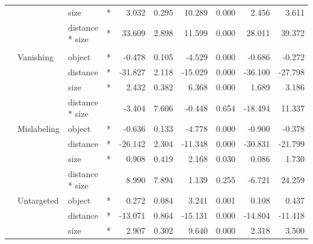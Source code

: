 \begin{longtable}[t]{llllrrrrrr}
\cmidrule{3-10}\nopagebreak
\hspace{1em} &  & size & * & 3.032 & 0.295 & 10.289 & 0.000 & 2.456 & 3.611\\
\cmidrule{3-10}\nopagebreak
\hspace{1em} &  & distance * size & * & 33.609 & 2.898 & 11.599 & 0.000 & 28.011 & 39.372\\
\cmidrule{1-10}\pagebreak[0]
\addlinespace[0.3em]
\multicolumn{10}{l}{\textbf{Faster R-CNN}}\\
\hspace{1em} & Vanishing & object & * & -0.478 & 0.105 & -4.529 & 0.000 & -0.686 & -0.272\\
\cmidrule{3-10}\nopagebreak
\hspace{1em} &  & distance & * & -31.827 & 2.118 & -15.029 & 0.000 & -36.100 & -27.798\\
\cmidrule{3-10}\nopagebreak
\hspace{1em} &  & size & * & 2.432 & 0.382 & 6.368 & 0.000 & 1.689 & 3.186\\
\cmidrule{3-10}\nopagebreak
\hspace{1em} &  & distance * size &  & -3.404 & 7.606 & -0.448 & 0.654 & -18.494 & 11.337\\
\cmidrule{2-10}\nopagebreak
\hspace{1em} & Mislabeling & object & * & -0.636 & 0.133 & -4.778 & 0.000 & -0.900 & -0.378\\
\cmidrule{3-10}\nopagebreak
\hspace{1em} &  & distance & * & -26.142 & 2.304 & -11.348 & 0.000 & -30.831 & -21.799\\
\cmidrule{3-10}\nopagebreak
\hspace{1em} &  & size & * & 0.908 & 0.419 & 2.168 & 0.030 & 0.086 & 1.730\\
\cmidrule{3-10}\nopagebreak
\hspace{1em} &  & distance * size &  & 8.990 & 7.894 & 1.139 & 0.255 & -6.721 & 24.259\\
\cmidrule{2-10}\nopagebreak
\hspace{1em} & Untargeted & object & * & 0.272 & 0.084 & 3.241 & 0.001 & 0.108 & 0.437\\
\cmidrule{3-10}\nopagebreak
\hspace{1em} &  & distance & * & -13.071 & 0.864 & -15.131 & 0.000 & -14.804 & -11.418\\
\cmidrule{3-10}\nopagebreak
\hspace{1em} &  & size & * & 2.907 & 0.302 & 9.640 & 0.000 & 2.318 & 3.500\\

\end{longtable}
